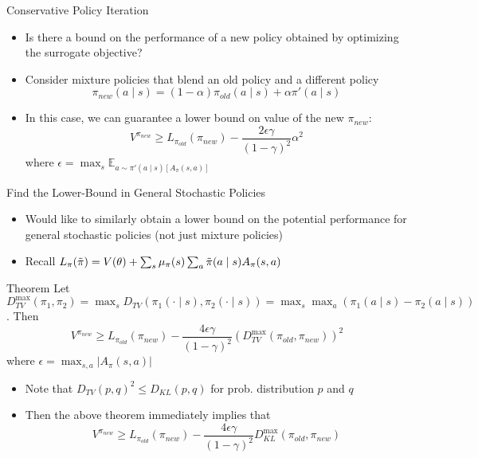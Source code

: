 \documentclass[aspectratio=169]{../latex_main/tntbeamer}  %
\begin{document}
\begin{frame}[c]{Conservative Policy Iteration}
	
    \begin{itemize}
        \item Is there a bound on the performance of a new policy obtained by optimizing the surrogate objective?
        \item Consider mixture policies that blend an old policy and a different policy
        $$\pi_{new}(a \mid s) = (1 - \alpha) \pi_{old} (a \mid s) + \alpha \pi'(a \mid s) $$
        \item In this case, we can guarantee a lower bound on value of the new $\pi_{new}$:
        $$V^{\pi_{new}} \geq L_{\pi_{old}} (\pi_{new}) - \frac{2\epsilon\gamma}{(1- \gamma)^2} \alpha^2 $$
        where $\epsilon = \max_{s} \mathbb{E}_{a \sim \pi'(a \mid s) [A_\pi(s,a)]}$
    \end{itemize}

\end{frame}
\begin{frame}[c]{Find the Lower-Bound in General Stochastic Policies}
	
	 \vspace{-1.5em}
    \begin{itemize}
        \item Would like to similarly obtain a lower bound on the potential performance for general stochastic policies (not just mixture policies)
        \item Recall $ L_\pi(\Tilde{\pi}) = V(\theta) + \sum_{s} \mu_\pi (s) \sum_{a} \Tilde{\pi}(a \mid s) A_\pi(s,a)$ 
    \end{itemize}
    
    \begin{block}{Theorem}
    Let $D_{TV}^{\max} (\pi_1, \pi_2) = \max_{s} D_{TV}(\pi_1(\cdot \mid s), \pi_2(\cdot\mid s)) = \max_{s} \max_{a} (\pi_1(a\mid s) -\pi_2 (a\mid s))$. Then
    $$V^{\pi_{new}} \geq L_{\pi_{old}} (\pi_{new}) - \frac{4\epsilon\gamma}{(1-\gamma)^2} (D_{TV}^{\max}(\pi_{old}, \pi_{new}))^2$$
    \vspace{-0.3em}
    where $\epsilon = \max_{s,a}|A_\pi(s,a)|$
    \end{block}
    
    \begin{itemize}
        \item Note that $D_{TV}(p,q)^2 \leq D_{KL}(p,q)$ for prob. distribution $p$ and $q$
        \item Then the above theorem immediately implies that
        $$ V^{\pi_{new}} \geq  L_{\pi_{old}} (\pi_{new}) -  \frac{4\epsilon\gamma}{(1-\gamma)^2} D_{KL}^{\max}(\pi_{old}, \pi_{new}) $$
    \end{itemize}

\end{frame}
\end{document}
